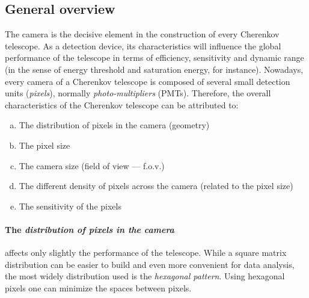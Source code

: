 \subsection{General overview}
%
The camera is the decisive element in the construction of every
Cherenkov telescope. As a detection device, its characteristics will
influence the global performance of the telescope in terms of
efficiency, sensitivity and dynamic range (in the sense of energy
threshold and saturation energy, for instance). Nowadays, every camera
of a Cherenkov telescope is composed of several small detection units
(\emph{pixels}), normally \emph{photo-multipliers} (PMTs). Therefore,
the overall characteristics of the Cherenkov telescope can be
attributed to:
%
\begin{enumerate}[a.]
\item The distribution of pixels in the camera (geometry)
\item The pixel size
\item The camera size (field of view --- f.o.v.)
\item The different density of pixels across the camera (related to
the pixel size)
\item The sensitivity of the pixels
\end{enumerate}

\paragraph{The \emph{distribution of pixels in the camera}} affects only
slightly the performance of the telescope. While a square matrix
distribution can be easier to build and even more convenient for data
analysis, the most widely distribution used is the \emph{hexagonal
pattern}. Using hexagonal pixels one can minimize the spaces between
pixels.

